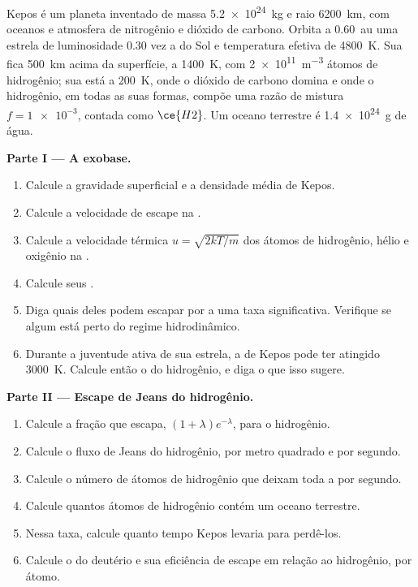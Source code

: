 \begin{problem}
\label{pb:b3:planetary-atmospheres:1}
Kepos é um planeta inventado de massa \qty{5.2e24}{kg} e raio
\qty{6200}{km}, com oceanos e atmosfera de nitrogênio e dióxido de
carbono. Orbita a \qty{0.60}{au} uma estrela de luminosidade 0.30 vez a do
Sol e temperatura efetiva de \qty{4800}{K}. Sua  fica
\qty{500}{km} acima da superfície, a \qty{1400}{K}, com
\qty{2e11}{m^{-3}} átomos de hidrogênio; sua  está a \qty{200}{K},
onde o dióxido de carbono domina e onde o hidrogênio, em todas as suas formas, compõe uma
razão de mistura $f = \num{1e-3}$, contada como $\ce{H2}$. Um oceano terrestre é
\qty{1.4e24}{g} de água.

\medskip\noindent\textbf{Parte I --- A exobase.}
\begin{enumerate}
\item Calcule a gravidade superficial e a densidade média de Kepos.
\item Calcule a velocidade de escape na .
\item Calcule a velocidade térmica $u = \sqrt{2kT/m}$ dos átomos de hidrogênio, hélio e
  oxigênio na .
\item Calcule seus .
\item Diga quais deles podem escapar por  a uma taxa significativa.
  Verifique se algum está perto do regime hidrodinâmico.
\item Durante a juventude ativa de sua estrela, a  de Kepos pode ter
  atingido \qty{3000}{K}. Calcule então o  do hidrogênio,
  e diga o que isso sugere.
\end{enumerate}

\medskip\noindent\textbf{Parte II --- Escape de Jeans do hidrogênio.}
\begin{enumerate}[resume]
\item Calcule a fração que escapa, $(1 + \lambda)e^{-\lambda}$, para
  o hidrogênio.
\item Calcule o fluxo de Jeans do hidrogênio, por metro quadrado e por segundo.
\item Calcule o número de átomos de hidrogênio que deixam toda a 
  por segundo.
\item Calcule quantos átomos de hidrogênio contém um oceano terrestre.
\item Nessa taxa, calcule quanto tempo Kepos levaria para perdê-los.
\item Calcule o  do deutério e sua eficiência de escape
  em relação ao hidrogênio, por átomo.
\end{enumerate}


\end{problem}
